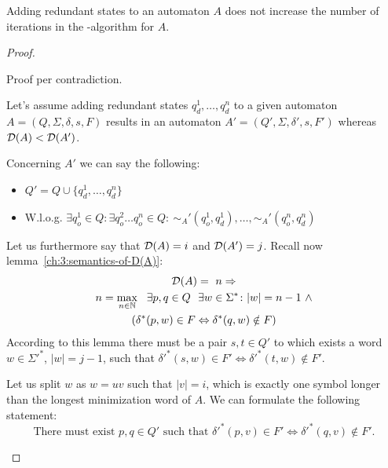 \begin{theorem}[]
	Adding redundant states to an automaton $A$ does not increase the number of iterations in the \CompDist-algorithm for $A$.
\end{theorem}

\begin{proof}
	\begin{description}
		\item
		
		Proof per contradiction.
		
		Let's assume adding redundant states $q_d^1, \ldots, q_d^n$ to a given automaton $A = (Q, \Sigma, \delta, s, F)$ results in an automaton $A' = (Q', \Sigma, \delta', s, F')$ whereas $\mathcal{D}(A) < \mathcal{D}(A')$.
		
		Concerning $A'$ we can say the following:
		\begin{itemize}
			\item $Q' = Q \cup \{ q_d^1, \ldots, q_d^n \}$
			\item W.l.o.g. $\exists q_o^1 \in Q \colon \exists q_o^2 \ldots q_o^n \in Q \colon\ \sim_A'(q_o^1, q_d^1), \ldots, \sim_A'(q_o^n, q_d^n)$
		\end{itemize}
		Let us furthermore say that $\mathcal{D}(A) = i$ and $\mathcal{D}(A') = j$. Recall now lemma~\ref{ch:3:semantics-of-D(A)}:
		\begin{multline*}
		\mathcal{D}(A) =\ n \Rightarrow \\
		n = \max_{n \in \mathbb{N}}\ \ \exists p, q \in Q\ \ \exists w \in \Sigma^* \colon |w| = n - 1\ \land \\
		(\delta^*(p,w) \in F \Leftrightarrow \delta^*(q,w) \notin F)
		\end{multline*}
		According to this lemma there must be a pair $s, t \in Q'$ to which exists a word $w \in \Sigma'^*$, $|w| = j - 1$, such that $\delta'^*(s,w) \in F' \Leftrightarrow \delta'^*(t,w) \notin F'$.
		
		Let us split $w$ as $w = uv$ such that $|v| = i$, which is exactly one symbol longer than the longest minimization word of $A$. We can formulate the following statement:
		\begin{equation}
		\text{There must exist }p, q \in Q'\text{ such that }\delta'^*(p,v) \in F' \Leftrightarrow \delta'^*(q,v) \notin F'.
		\end{equation}
		

\end{description}
\end{proof}
